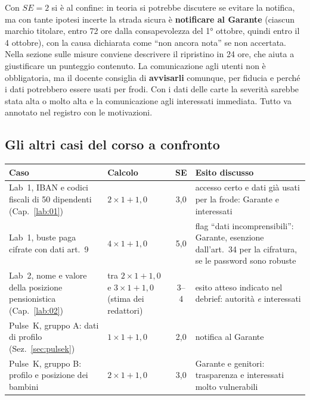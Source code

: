 \begin{soluzione}
Con $SE = 2$ si è al confine: in teoria si potrebbe discutere se evitare la notifica, ma con tante
ipotesi incerte la strada sicura è \textbf{notificare al Garante} (ciascun marchio titolare, entro 72
ore dalla consapevolezza del 1° ottobre, quindi entro il 4 ottobre), con la causa dichiarata come ``non
ancora nota'' se non accertata. Nella sezione sulle misure conviene descrivere il ripristino in 24 ore,
che aiuta a giustificare un punteggio contenuto. La comunicazione agli utenti non è obbligatoria, ma il
docente consiglia di \textbf{avvisarli} comunque, per fiducia e perché i dati potrebbero essere usati per
frodi. Con i dati delle carte la severità sarebbe stata alta o molto alta e la comunicazione agli
interessati immediata. Tutto va annotato nel registro con le motivazioni.
\end{soluzione}

\subsection{Gli altri casi del corso a confronto}
\begin{center}
\small
\begin{tabularx}{\linewidth}{>{\raggedright\arraybackslash}p{3.3cm} >{\raggedright\arraybackslash}p{2.7cm} c X}
\toprule
\textbf{Caso} & \textbf{Calcolo} & \textbf{SE} & \textbf{Esito discusso}\\
\midrule
Lab~1, IBAN e codici fiscali di 50 dipendenti (Cap.~\ref{lab:01}) & $2 \times 1 + 1{,}0$ & 3,0 &
  accesso certo e dati già usati per la frode: Garante e interessati\\
Lab~1, buste paga cifrate con dati art.~9 & $4 \times 1 + 1{,}0$ & 5,0 & flag ``dati incomprensibili'':
  Garante, esenzione dall'art.~34 per la cifratura, se le password sono robuste\\
Lab~2, nome e valore della posizione pensionistica (Cap.~\ref{lab:02}) & tra $2 \times 1 + 1{,}0$ e
  $3 \times 1 + 1{,}0$ (stima dei redattori) & 3--4 & esito atteso indicato nel debrief: autorità
  \emph{e} interessati\\
Pulse~K, gruppo A: dati di profilo (Sez.~\ref{sec:pulsek}) & $1 \times 1 + 1{,}0$ & 2,0 & notifica al
  Garante\\
Pulse~K, gruppo B: profilo e posizione dei bambini & $2 \times 1 + 1{,}0$ & 3,0 & Garante e genitori:
  trasparenza e interessati molto vulnerabili\\
\bottomrule
\end{tabularx}
\end{center}

